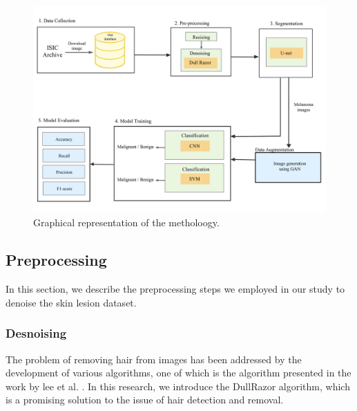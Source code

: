 \documentclass[12pt]{diazessay}
\newcommand{\RomanNumeralCaps}[1]
{\MakeUppercase{\romannumeral #1}}
\begin{document}
  \begin{figure}[H]
        \centering
        \includegraphics[width=15cm]{Figures/methodology.jpeg}
        \caption[Graphical representation of the metholoogy]{Graphical representation of the metholoogy.}
        \label{fig:Methodology}
    \end{figure}



    \subsection{Preprocessing}
    \-\hspace{0.7cm}In this section, we describe the preprocessing steps we employed in our study to denoise the skin lesion dataset.
    
    \subsubsection{Desnoising}
    \-\hspace{0.7cm} The problem of removing hair from images has been addressed by the development of various algorithms, one of which is the algorithm presented in the work by lee et al. \cite{LEE1997533}. In this research, we introduce the DullRazor algorithm, which is a promising solution to the issue of hair detection and removal.\\

    
    
\end{document}
